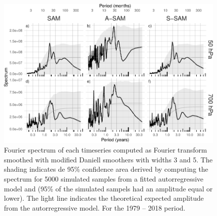 \documentclass[smallextended]{svjour3}       %
\begin{document}
\begin{figure}
\includegraphics{A2-1} \caption{Fourier spectrum of each timeseries computed as Fourier transform smoothed with modified Daniell smoothers with widths 3 and 5. The shading indicates de 95\% confidence area derived by computing the spectrum for 5000 simulated samples from a fitted autorregressive model and (95\% of the simulated sampels had an amplitude equal or lower). The light line indicates the theoretical expected amplitude from the autorregressive model. For the 1979 -- 2018 period.}\label{fig:A2}
\end{figure}
\end{document}
